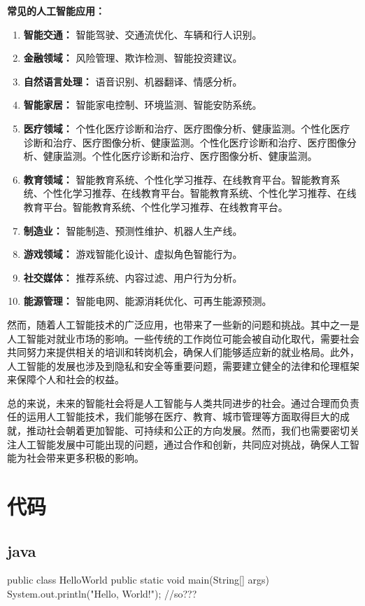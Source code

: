 \documentclass[11pt, a4paper, oneside, fontset=none]{ctexbook}
\begin{document}
\textbf{常见的人工智能应用：}
\begin{enumerate}
    \item \textbf{智能交通：} 智能驾驶、交通流优化、车辆和行人识别。
    \item \textbf{金融领域：} 风险管理、欺诈检测、智能投资建议。
    \item \textbf{自然语言处理：} 语音识别、机器翻译、情感分析。
    \item \textbf{智能家居：} 智能家电控制、环境监测、智能安防系统。
    \item \textbf{医疗领域：} 个性化医疗诊断和治疗、医疗图像分析、健康监测。个性化医疗诊断和治疗、医疗图像分析、健康监测。个性化医疗诊断和治疗、医疗图像分析、健康监测。个性化医疗诊断和治疗、医疗图像分析、健康监测。
    \item \textbf{教育领域：} 智能教育系统、个性化学习推荐、在线教育平台。智能教育系统、个性化学习推荐、在线教育平台。智能教育系统、个性化学习推荐、在线教育平台。智能教育系统、个性化学习推荐、在线教育平台。
    \item \textbf{制造业：} 智能制造、预测性维护、机器人生产线。
    \item \textbf{游戏领域：} 游戏智能化设计、虚拟角色智能行为。
    \item \textbf{社交媒体：} 推荐系统、内容过滤、用户行为分析。
    \item \textbf{能源管理：} 智能电网、能源消耗优化、可再生能源预测。
\end{enumerate}

然而，随着人工智能技术的广泛应用，也带来了一些新的问题和挑战。其中之一是人工智能对就业市场的影响。一些传统的工作岗位可能会被自动化取代，需要社会共同努力来提供相关的培训和转岗机会，确保人们能够适应新的就业格局。此外，人工智能的发展也涉及到隐私和安全等重要问题，需要建立健全的法律和伦理框架来保障个人和社会的权益。

总的来说，未来的智能社会将是人工智能与人类共同进步的社会。通过合理而负责任的运用人工智能技术，我们能够在医疗、教育、城市管理等方面取得巨大的成就，推动社会朝着更加智能、可持续和公正的方向发展。然而，我们也需要密切关注人工智能发展中可能出现的问题，通过合作和创新，共同应对挑战，确保人工智能为社会带来更多积极的影响。
\chapter{代码}
\section{java}
\begin{java}[caption=Java程序1]
public class HelloWorld {
    public static void main(String[] args) {
        System.out.println("Hello, World!");
        //so???
    }
}
\end{java}
\end{document}
